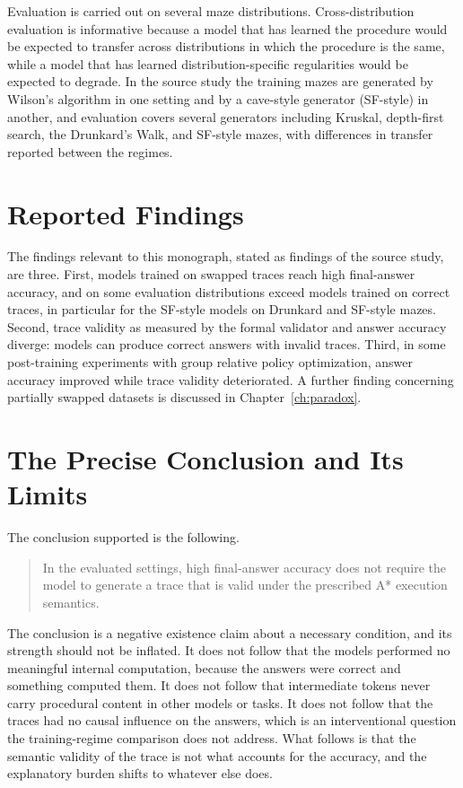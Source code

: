 Evaluation is carried out on several maze distributions. Cross-distribution evaluation is informative because a model that has learned the procedure would be expected to transfer across distributions in which the procedure is the same, while a model that has learned distribution-specific regularities would be expected to degrade. In the source study the training mazes are generated by Wilson's algorithm in one setting and by a cave-style generator (SF-style) in another, and evaluation covers several generators including Kruskal, depth-first search, the Drunkard's Walk, and SF-style mazes, with differences in transfer reported between the regimes.

\section{Reported Findings}

The findings relevant to this monograph, stated as findings of the source study, are three. First, models trained on swapped traces reach high final-answer accuracy, and on some evaluation distributions exceed models trained on correct traces, in particular for the SF-style models on Drunkard and SF-style mazes. Second, trace validity as measured by the formal validator and answer accuracy diverge: models can produce correct answers with invalid traces. Third, in some post-training experiments with group relative policy optimization, answer accuracy improved while trace validity deteriorated. A further finding concerning partially swapped datasets is discussed in Chapter~\ref{ch:paradox}.

\section{The Precise Conclusion and Its Limits}

The conclusion supported is the following.

\begin{quote}
In the evaluated settings, high final-answer accuracy does not require the model to generate a trace that is valid under the prescribed A* execution semantics.
\end{quote}

The conclusion is a negative existence claim about a necessary condition, and its strength should not be inflated. It does not follow that the models performed no meaningful internal computation, because the answers were correct and something computed them. It does not follow that intermediate tokens never carry procedural content in other models or tasks. It does not follow that the traces had no causal influence on the answers, which is an interventional question the training-regime comparison does not address. What follows is that the semantic validity of the trace is not what accounts for the accuracy, and the explanatory burden shifts to whatever else does.

